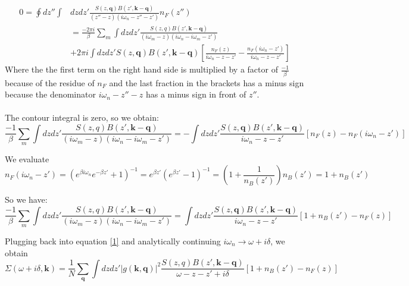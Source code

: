 \documentclass[]{article}
\newcommand{\kk}{\mathbf{k}}
\newcommand{\qq}{\mathbf{q}}
\newcommand{\iwn}{i\omega_n}
\newcommand{\iwm}{i\omega_m}
\newcommand{\gs}{\left| g(\mathbf{k}, \mathbf{q}) \right|^2}
\begin{document}
\begin{equation}
\begin{split}
0=\oint dz'' \int & dz dz'  \frac{S(z,\qq)B(z',\kk-\qq)}{(z''-z)(\iwn-z''-z')} n_F(z'') \\ &= \frac{-2\pi i}{\beta} \sum_m \int dz dz'\frac{S(z,q) B(z',\kk-\qq)}{(\iwm-z)(\iwn-\iwm-z')} \\
&+ 2\pi i \int dz dz' S(z,\qq) B(z',\kk-\qq) \left[\frac{n_F(z)}{\iwn-z-z'} - \frac{n_F(\iwn-z')}{\iwn-z-z'}\right]
\end{split}
\end{equation}
Where the the first term on the right hand side is multiplied by a factor of $\frac{-1}{\beta}$ because of the residue of $n_F$ and the last fraction in the brackets has a minus sign because the denominator $\iwn-z''-z$ has a minus sign in front of $z''$.
\\
\\
The contour integral is zero, so we obtain:
\begin{equation}
\frac{-1}{\beta} \sum_m \int dz dz'\frac{S(z,q) B(z',\kk-\qq)}{(\iwm-z)(\iwn-\iwm-z')} 
= -\int dz dz' \frac{S(z,\qq) B(z',\kk-\qq)}{\iwn-z-z'} \left[n_F(z) - n_F(\iwn-z')\right]
\end{equation}

We evaluate 
\begin{equation}
n_F(\iwn-z') = \left(e^{\beta\iwn}e^{-\beta z'} + 1\right)^{-1} = e^{\beta z'}\left(e^{\beta z'} - 1\right)^{-1} = \left(1 + \frac{1}{n_B(z')}\right)n_B(z') = 1 + n_B(z')
\end{equation}

So we have:
\begin{equation}
\frac{-1}{\beta} \sum_m \int dz dz'\frac{S(z,q) B(z',\kk-\qq)}{(\iwm-z)(\iwn-\iwm-z')} 
= \int dz dz' \frac{S(z,\qq) B(z',\kk-\qq)}{\iwn-z-z'} \left[1 + n_B(z') - n_F(z)\right]
\end{equation}

Plugging back into equation \ref{1} and analytically continuing $\iwn \rightarrow \omega+i\delta$, we obtain
\begin{equation}
\Sigma(\omega+i\delta, \kk) = \frac{1}{N} \sum_\qq \int dz dz' \gs \frac{S(z,q) B(z',\kk-\qq)}{\omega-z-z'+i\delta} \left[1 + n_B(z') - n_F(z)\right]
\end{equation}
\end{document}
